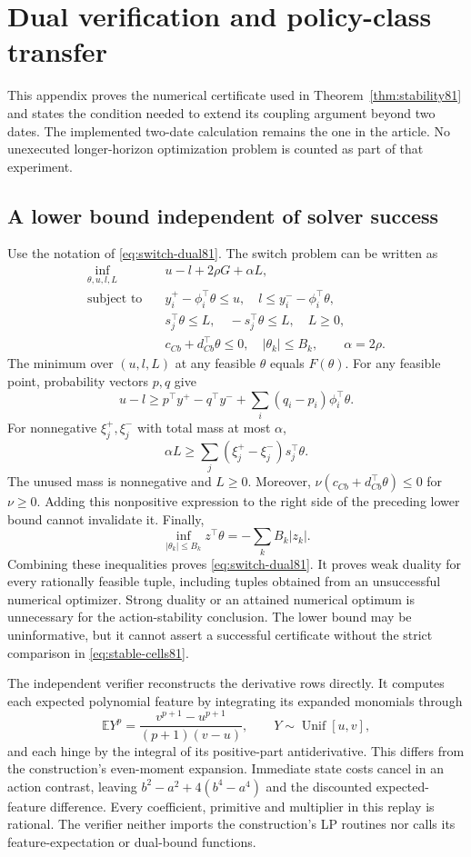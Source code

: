 \section{Dual verification and policy-class transfer}\label{app:dual81}
This appendix proves the numerical certificate used in Theorem~\ref{thm:stability81} and states the condition needed to extend its coupling argument beyond two dates. The implemented two-date calculation remains the one in the article. No unexecuted longer-horizon optimization problem is counted as part of that experiment.

\subsection{A lower bound independent of solver success}
Use the notation of \eqref{eq:switch-dual81}. The switch problem can be written as
\begin{align*}
 \inf_{\theta,u,l,L}\quad&u-l+2\rho G+\alpha L,\\
 \text{subject to}\quad&y_i^+-\phi_i^\top\theta\le u,\quad
                  l\le y_i^--\phi_i^\top\theta,\\
 &s_j^\top\theta\le L,\quad-s_j^\top\theta\le L,\quad L\ge0,\\
 &c_{Cb}+d_{Cb}^\top\theta\le0,\quad |\theta_k|\le B_k,
 \qquad \alpha=2\rho.
\end{align*}
The minimum over $(u,l,L)$ at any feasible $\theta$ equals $F(\theta)$. For any feasible point, probability vectors $p,q$ give
\[
 u-l\ge p^\top y^+-q^\top y^-+
                         \sum_i(q_i-p_i)\phi_i^\top\theta.
\]
For nonnegative $\xi_j^+,\xi_j^-$ with total mass at most $\alpha$,
\[
 \alpha L\ge\sum_j(\xi_j^+-\xi_j^-)s_j^\top\theta.
\]
The unused mass is nonnegative and $L\ge0$. Moreover, $\nu(c_{Cb}+d_{Cb}^\top\theta)\le0$ for $\nu\ge0$. Adding this nonpositive expression to the right side of the preceding lower bound cannot invalidate it. Finally,
\[
 \inf_{|\theta_k|\le B_k}z^\top\theta=-\sum_kB_k|z_k|.
\]
Combining these inequalities proves \eqref{eq:switch-dual81}. It proves weak duality for every rationally feasible tuple, including tuples obtained from an unsuccessful numerical optimizer. Strong duality or an attained numerical optimum is unnecessary for the action-stability conclusion. The lower bound may be uninformative, but it cannot assert a successful certificate without the strict comparison in \eqref{eq:stable-cells81}.

The independent verifier reconstructs the derivative rows directly. It computes each expected polynomial feature by integrating its expanded monomials through
\[
 \mathbb E Y^p=\frac{v^{p+1}-u^{p+1}}{(p+1)(v-u)},
                  \qquad Y\sim\operatorname{Unif}[u,v],
\]
and each hinge by the integral of its positive-part antiderivative. This differs from the construction's even-moment expansion. Immediate state costs cancel in an action contrast, leaving $b^2-a^2+4(b^4-a^4)$ and the discounted expected-feature difference. Every coefficient, primitive and multiplier in this replay is rational. The verifier neither imports the construction's LP routines nor calls its feature-expectation or dual-bound functions.

